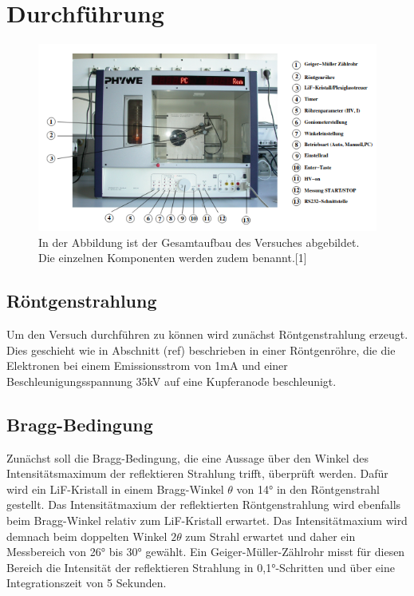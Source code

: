 \documentclass[titlepage = firstcover]{scrartcl}
\begin{document}
            \FloatBarrier


    \section{Durchführung}

    \FloatBarrier

    \begin{figure}[h]
      \centering
      \includegraphics{Aufbau.png}
      \caption{In der Abbildung ist der Gesamtaufbau des Versuches abgebildet. Die einzelnen Komponenten werden zudem benannt.[1]}
      \label{fig:Aufbau}
    \end{figure}

    \FloatBarrier

            
        \subsection{Röntgenstrahlung}
          Um den Versuch durchführen zu können wird zunächst Röntgenstrahlung erzeugt. Dies geschieht wie in Abschnitt (ref) beschrieben in einer Röntgenröhre, die die Elektronen bei einem Emissionsstrom
          von 1mA und einer Beschleunigungsspannung 35kV auf eine Kupferanode beschleunigt. 

        \subsection{Bragg-Bedingung}
          Zunächst soll die Bragg-Bedingung, die eine Aussage über den Winkel des Intensitätsmaximum der reflektieren Strahlung trifft, überprüft werden. Dafür wird ein LiF-Kristall in einem 
          Bragg-Winkel $\theta$ von 14° in den Röntgenstrahl gestellt. Das Intensitätmaxium der reflektierten Röntgenstrahlung wird ebenfalls beim Bragg-Winkel relativ zum LiF-Kristall erwartet. 
          Das Intensitätmaxium wird demnach beim doppelten Winkel $2\theta$ zum Strahl erwartet und daher ein Messbereich von 26° bis 30° gewählt. Ein Geiger-Müller-Zählrohr misst
          für diesen Bereich die Intensität der reflektieren Strahlung in 0,1°-Schritten und über eine Integrationszeit von 5 Sekunden.
\end{document}
